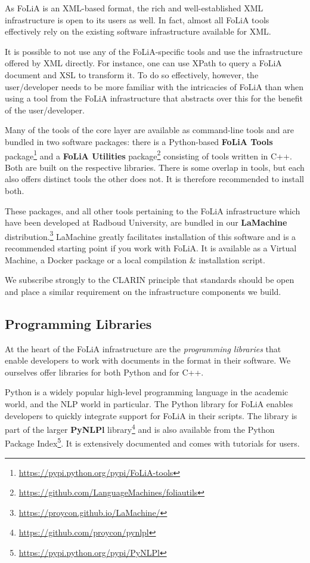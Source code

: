\documentclass[a4paper,11pt]{article}
\begin{document}
As FoLiA is an XML-based format, the rich and well-established XML
infrastructure is open to its users as well. In fact, almost all FoLiA tools
effectively rely on the existing software infrastructure available for XML. 

It is possible to not use any of the FoLiA-specific tools and use the
infrastructure offered by XML directly. For instance, one can use XPath to
query a FoLiA document and XSL to transform it. To do so effectively, however,
the user/developer needs to be more familiar with the intricacies of FoLiA than when using a tool from the FoLiA infrastructure that abstracts over this
for the benefit of the user/developer.

Many of the tools of the core layer are available as command-line tools and are
bundled in two software packages: there is a Python-based \textbf{FoLiA Tools}
package\footnote{\url{https://pypi.python.org/pypi/FoLiA-tools}} and a \textbf{FoLiA
Utilities} package\footnote{\url{https://github.com/LanguageMachines/foliautils}}
consisting of tools written in C++. Both are built on the respective libraries.
There is some overlap in tools, but each also offers distinct tools the other
does not. It is therefore recommended to install both.

These packages, and all other tools pertaining to the FoLiA infrastructure
which have been developed at Radboud University, are bundled in our
\textbf{LaMachine}
distribution.\footnote{\url{https://proycon.github.io/LaMachine/}} LaMachine
greatly facilitates installation of this software and is a recommended starting
point if you work with FoLiA. It is available as a Virtual Machine, a Docker
package or a local compilation \& installation script.

We subscribe strongly to the CLARIN principle that standards should be open and
place a similar requirement on the infrastructure components we build. 

\subsection{Programming Libraries}

At the heart of the FoLiA infrastructure are the \emph{programming libraries} that
enable developers to work with documents in the format in their software. We
ourselves offer libraries for both Python and for C++.

Python is a widely popular high-level programming language in the academic
world, and the NLP world in particular.  The Python library for FoLiA enables
developers to quickly integrate support for FoLiA in their scripts. The library
is part of the larger \textbf{PyNLPl}
library\footnote{\url{https://github.com/proycon/pynlpl}} and is also available from the
Python Package Index\footnote{\url{https://pypi.python.org/pypi/PyNLPl}}. It is extensively documented and comes with tutorials for
users.
\end{document}

